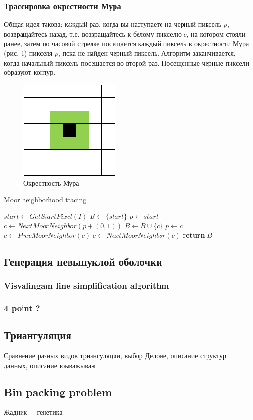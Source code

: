 \documentclass{fefu}
\begin{document}
\subsubsection{Трассировка окрестности Мура}
Общая идея такова: каждый раз, когда вы наступаете на черный пиксель $p$, возвращайтесь назад, т.е. возвращайтесь к белому
пикселю $c$, на котором стояли ранее, затем по часовой стрелке посещается каждый пиксель в окрестности Мура (рис. 1)
пикселя $p$, пока не найден черный пиксель. Алгоритм заканчивается, когда начальный пиксель посещается во второй раз.
Посещенные черные пиксели образуют контур.
\begin{figure}[H]
    \centering
    \includegraphics[scale=0.7]{images/MooreNeighbourhood.png}
    \caption{Окрестность Мура}
\end{figure}
\begin{algorithm}
    \caption{Moor neighborhood tracing}
    \begin{algorithmic}[1]
         
            \State $start \gets GetStartPixel(I)$
            \State $B \gets \{start\}$
            \State $p \gets start$
            \State $c \gets NextMoorNeighbor\left(p + \left(0, 1\right)\right)$
                    \State $B \gets B \cup \{c\}$
                    \State $p \gets c$
                    \State $c \gets PrevMoorNeighbor(c)$
                \Else
                    \State $c \gets NextMoorNeighbor(c)$
                \EndIf
            \EndWhile
            \State \textbf{return} $B$
        \EndProcedure
    \end{algorithmic}
\end{algorithm}
\subsection{Генерация невыпуклой оболочки}
\subsubsection{Visvalingam line simplification algorithm}
\subsubsection{4 point ?}
\subsection{Триангуляция}
Сравнение разных видов триангуляции, выбор Делоне, описание структур данных, описание юыважываж
\subsection{Bin packing problem}
Жадник + генетика
\newpage


\end{document}
